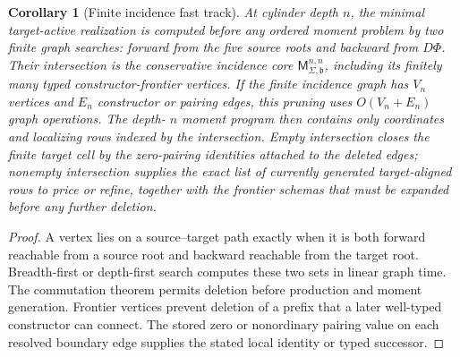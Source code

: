 \documentclass[11pt]{article}
\numberwithin{section}{part}
\theoremstyle{plain}
\newtheorem{corollary}[corollary]{Corollary}
\theoremstyle{definition}
\theoremstyle{remark}
\begin{document}
\begin{corollary}[Finite incidence fast track]
\label{cor:finite-incidence-fast-track}
At cylinder depth \(n\), the minimal target-active realization is computed
before any ordered moment problem by two finite graph searches: forward from
the five source roots and backward from \(D\Phi\).  Their intersection is
the conservative incidence core
\(\mathsf M^{n,n}_{\Sigma,\mathfrak b}\), including its finitely many typed
constructor-frontier vertices.  If the finite incidence graph has
\(V_n\) vertices and \(E_n\) constructor or pairing edges, this pruning uses
\(O(V_n+E_n)\) graph operations.  The depth-
\(n\) moment program then contains only coordinates and localizing rows
indexed by the intersection.  Empty intersection closes the finite target
cell by the zero-pairing identities attached to the deleted edges; nonempty
intersection supplies the exact list of currently generated target-aligned
rows to price or refine, together with the frontier schemas that must be
expanded before any further deletion.
\end{corollary}

\begin{proof}
A vertex lies on a source--target path exactly when it is both forward
reachable from a source root and backward reachable from the target root.
Breadth-first or depth-first search computes these two sets in linear graph
time.  The commutation theorem permits deletion before production and moment
generation.  Frontier vertices prevent deletion of a prefix that a later
well-typed constructor can connect.  The stored zero or nonordinary pairing
value on each resolved boundary edge supplies the stated local identity or
typed successor.
\end{proof}
\end{document}

